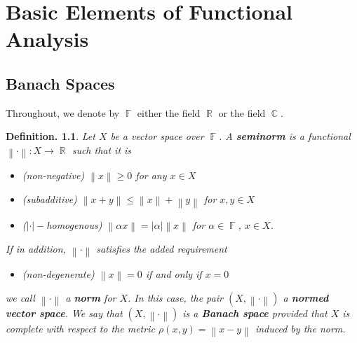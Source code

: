 \documentclass[11pt, a4paper]{memoir}
\DeclareMathOperator{\R}{{\mathbb{R}}}
\DeclareMathOperator{\C}{{\mathbb{C}}}
\DeclareMathOperator{\F}{{\mathbb{F}}}
\newcommand{\norm}[1]{\ensuremath{\left\lVert#1\right\rVert}}
\newcommand{\abs}[1]{\ensuremath{\left\lvert#1\right\rvert}}
\theoremstyle{change}
\theoremstyle{plain}
\theoremstyle{nonumberplain}
\newtheorem{definition}{Definition.}
\numberwithin{equation}{section}
\begin{document}
\chapter{Basic Elements of Functional Analysis}
\section{Banach Spaces}
Throughout, we denote by $\F$ either the field $\R$ or the field $\C$.
\begin{definition}
    Let $X$ be a vector space over $\F$.
    A \textbf{seminorm} is a functional $\norm{\cdot}:X\to\R$ such that it is
    \begin{itemize}[nl]
        \item \textit{(non-negative)} $\norm{x}\geq 0$ for any $x\in X$
        \item \textit{(subadditive)} $\norm{x+y}\leq\norm{x}+\norm{y}$ for $x,y\in X$
        \item \textit{($\abs{\cdot}-$homogenous)} $\norm{\alpha x}=\abs{\alpha}\norm{x}$ for $\alpha\in\F$, $x\in X$.
    \end{itemize}
    If in addition, $\norm{\cdot}$ satisfies the added requirement
    \begin{itemize}[nl]
        \item \textit{(non-degenerate)} $\norm{x}=0$ if and only if $x=0$
    \end{itemize}
    we call $\norm{\cdot}$ a \textbf{norm} for $X$.
    In this case, the pair $(X,\norm{\cdot})$ a \textbf{normed vector space}.
    We say that $(X,\norm{\cdot})$ is a \textbf{Banach space} provided that $X$ is complete with respect to the metric $\rho(x,y)=\norm{x-y}$ induced by the norm.
\end{definition}
\end{document}
